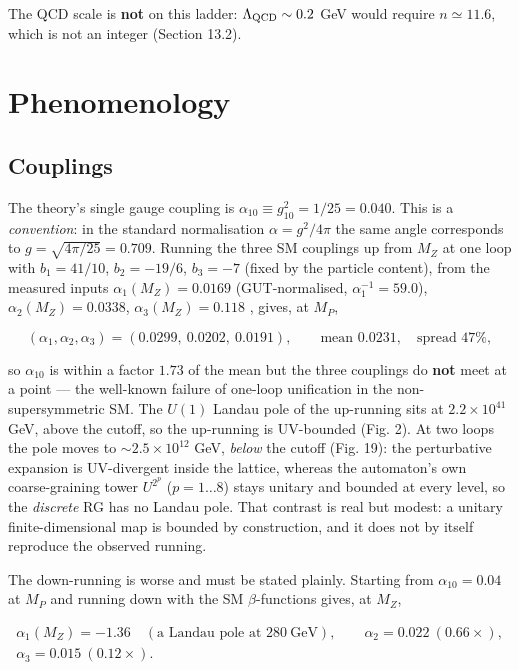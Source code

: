 \documentclass[aps,prd,amsmath,amssymb,superscriptaddress,longbibliography,floatfix,preprint]{revtex4-2}
\begin{document}
The QCD scale is \textbf{not} on this ladder: $\Lambda_{\rm QCD}\sim 0.2$ GeV would require $n \simeq 11.6$, which is not an integer (Section 13.2).

\section{Phenomenology}

\subsection{Couplings}

The theory's single gauge coupling is $\alpha_{10} \equiv g_{10}^2 = 1/25 = 0.040$. This is a \emph{convention}: in the standard normalisation $\alpha = g^2/4\pi$ the same angle corresponds to $g = \sqrt{4\pi/25} = 0.709$. Running the three SM couplings up from $M_Z$ at one loop with $b_1 = 41/10$, $b_2 = -19/6$, $b_3 = -7$ (fixed by the particle content), from the measured inputs $\alpha_1(M_Z) = 0.0169$ (GUT-normalised, $\alpha_1^{-1} = 59.0$), $\alpha_2(M_Z) = 0.0338$, $\alpha_3(M_Z) = 0.118$ \cite{ref13}, gives, at $M_P$,

\[(\alpha_1,\alpha_2,\alpha_3) = (0.0299,\ 0.0202,\ 0.0191),\qquad \text{mean } 0.0231,\quad \text{spread } 47\%,\]

so $\alpha_{10}$ is within a factor $1.73$ of the mean but the three couplings do \textbf{not} meet at a point --- the well-known failure of one-loop unification in the non-supersymmetric SM. The $U(1)$ Landau pole of the up-running sits at $2.2\times10^{41}$ GeV, above the cutoff, so the up-running is UV-bounded (Fig. 2). At two loops \cite{ref49} the pole moves to $\sim 2.5\times10^{12}$ GeV, \emph{below} the cutoff (Fig. 19): the perturbative expansion is UV-divergent inside the lattice, whereas the automaton's own coarse-graining tower $U^{2^p}$ ($p = 1\dots8$) stays unitary and bounded at every level, so the \emph{discrete} RG has no Landau pole. That contrast is real but modest: a unitary finite-dimensional map is bounded by construction, and it does not by itself reproduce the observed running.

The down-running is worse and must be stated plainly. Starting from $\alpha_{10} = 0.04$ at $M_P$ and running down with the SM $\beta$-functions gives, at $M_Z$,

\[
\begin{gathered}
\alpha_1(M_Z) = -1.36\quad(\text{a Landau pole at } 280\ \mathrm{GeV}),\qquad \alpha_2 = 0.022\ (0.66\times), \\ \alpha_3 = 0.015\ (0.12\times).
\end{gathered}
\]
\end{document}
